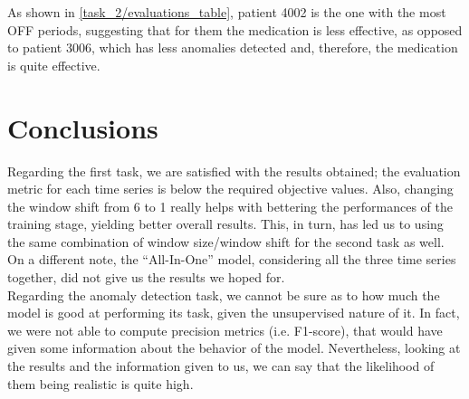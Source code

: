 \documentclass[12pt,a4paper,leqno]{article}
\begin{document}
	As shown in \autoref{task_2/evaluations_table}, patient 4002 is the one with the most OFF periods, suggesting that for them the medication is less effective, as opposed to patient 3006, which has less anomalies detected and, therefore, the medication is quite effective.
	
	\newpage
	
	\section{Conclusions}
	Regarding the first task, we are satisfied with the results obtained; the evaluation metric for each time series is below the required objective values. Also, changing the window shift from 6 to 1 really helps with bettering the performances of the training stage, yielding better overall results. This, in turn, has led us to using the same combination of window size/window shift for the second task as well. On a different note, the “All-In-One” model, considering all the three time series together, did not give us the results we hoped for.\\
	Regarding the anomaly detection task, we cannot be sure as to how much the model is good at performing its task, given the unsupervised nature of it. In fact, we were not able to compute precision metrics (i.e. F1-score), that would have given some information about the behavior of the model. Nevertheless, looking at the results and the information given to us, we can say that the likelihood of them being realistic is quite high.
	
\end{document}
